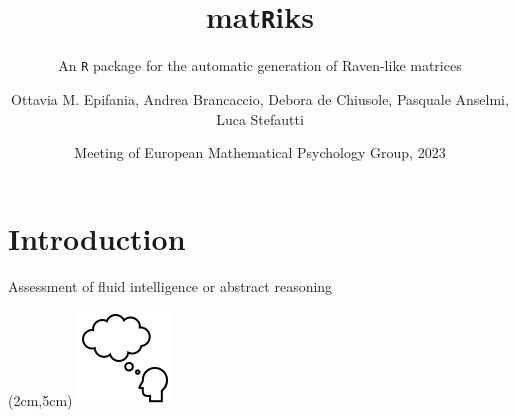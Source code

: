 \documentclass{beamer}
\title{mat\texttt{R}iks}
\subtitle{An \texttt{R} package for the automatic generation of Raven-like matrices}
\author{Ottavia M. Epifania, Andrea Brancaccio, Debora de Chiusole, Pasquale Anselmi, Luca Stefautti}
\institute{Universty of Padova, IT}
\date{Meeting of European Mathematical Psychology Group, 2023}
\begin{document}
	
\begin{frame}[plain]
    \maketitle
\end{frame}

\section{Introduction}

\begin{frame}
	Assessment of fluid intelligence or abstract reasoning 
	
	
	\begin{textblock*}{2cm}(2cm,5cm)
		\includegraphics[width =\linewidth]{img/think1.png}
	\end{textblock*}
	

\end{frame}
\end{document}
